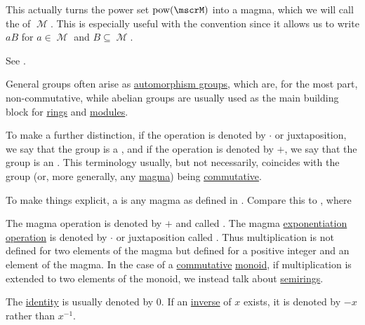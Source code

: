 \begin{definition}
\begin{DefEnum}
    This actually turns the power set \( \Pow(\mscrM) \) into a magma, which we will call the  of \( \mscrM \). This is especially useful with the convention  since it allows us to write \( aB \) for \( a \in \mscrM \) and \( B \subseteq \mscrM \).

    See .
  \end{DefEnum}
\end{definition}

\begin{remark}\label{rem:additive_magma}
  General groups often arise as \hyperref[def:automorphism_group]{automorphism groups}, which are, for the most part, non-commutative, while abelian groups are usually used as the main building block for \hyperref[def:semiring/ring]{rings} and \hyperref[def:left_module]{modules}.

  To make a further distinction, if the operation is denoted by \( \cdot \) or juxtaposition, we say that the group is a , and if the operation is denoted by \( + \), we say that the group is an . This terminology usually, but not necessarily, coincides with the group (or, more generally, any \hyperref[def:magma]{magma}) being \hyperref[def:magma/commutative]{commutative}.

  To make things explicit, a  is any magma as defined in . Compare this to , where
  \begin{RemEnum}
     The magma operation is denoted by \( + \) and called .
     The magma \hyperref[def:magma/exponentiation]{exponentiation operation} is denoted by \( \cdot \) or juxtaposition called . Thus multiplication is not defined for two elements of the magma but defined for a positive integer and an element of the magma. In the case of a \hyperref[def:magma/commutative]{commutative} \hyperref[def:unital_magma/associative]{monoid}, if multiplication is extended to two elements of the monoid, we instead talk about \hyperref[def:semiring]{semirings}.

     The \hyperref[def:magma_identity]{identity} is usually denoted by \( 0 \).
     If an \hyperref[def:unital_magma_inverse_element]{inverse} of \( x \) exists, it is denoted by \( -x \) rather than \( x^{-1} \).
  \end{RemEnum}
\end{remark}

